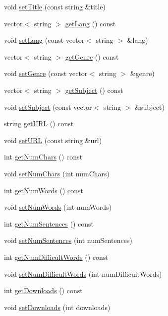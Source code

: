 \begin{DoxyCompactItemize}
void \mbox{\hyperlink{classbridges_1_1_book_a68e4e04db8915b6baff809c46e6d1df9}{set\+Title}} (const string \&title)
\item 
vector$<$ string $>$ \mbox{\hyperlink{classbridges_1_1_book_a946923e7d93c552f699ef44a5bbed643}{get\+Lang}} () const
\item 
void \mbox{\hyperlink{classbridges_1_1_book_a7c96cf79f310f78eb16035c6874afa05}{set\+Lang}} (const vector$<$ string $>$ \&lang)
\item 
vector$<$ string $>$ \mbox{\hyperlink{classbridges_1_1_book_a5c7c8787f7dca4634980d657807a0b22}{get\+Genre}} () const
\item 
void \mbox{\hyperlink{classbridges_1_1_book_a3743b908548b944543af533b030a1eca}{set\+Genre}} (const vector$<$ string $>$ \&genre)
\item 
vector$<$ string $>$ \mbox{\hyperlink{classbridges_1_1_book_a95158e5538b78c2115a2102b33d56980}{get\+Subject}} () const
\item 
void \mbox{\hyperlink{classbridges_1_1_book_aff19a506929a6df5503e2cd3e293381e}{set\+Subject}} (const vector$<$ string $>$ \&subject)
\item 
string \mbox{\hyperlink{classbridges_1_1_book_a3facf86f7560e974ec7cd81e0fc58800}{get\+U\+RL}} () const
\item 
void \mbox{\hyperlink{classbridges_1_1_book_a48d590f296837b8eb9ac10451c83d23b}{set\+U\+RL}} (const string \&url)
\item 
int \mbox{\hyperlink{classbridges_1_1_book_a96343d553aeadefe8aa88da3e1e9e635}{get\+Num\+Chars}} () const
\item 
void \mbox{\hyperlink{classbridges_1_1_book_a31f85f174ab86e6f9eb2131c3dbe1cdf}{set\+Num\+Chars}} (int num\+Chars)
\item 
int \mbox{\hyperlink{classbridges_1_1_book_a8da8afb48552bcc8095829c2741aa22f}{get\+Num\+Words}} () const
\item 
void \mbox{\hyperlink{classbridges_1_1_book_acbed3f0ff253868d8747826a27ef30ac}{set\+Num\+Words}} (int num\+Words)
\item 
int \mbox{\hyperlink{classbridges_1_1_book_ab426149d54f152a6a8e67d75d9b37f25}{get\+Num\+Sentences}} () const
\item 
void \mbox{\hyperlink{classbridges_1_1_book_af16061c14c40b1672c7801a4c3a2d33b}{set\+Num\+Sentences}} (int num\+Sentences)
\item 
int \mbox{\hyperlink{classbridges_1_1_book_a6a2622b9eee31c4abd222282f72e641c}{get\+Num\+Difficult\+Words}} () const
\item 
void \mbox{\hyperlink{classbridges_1_1_book_adc7a54f2a494aeac02cadb3eb4caedbc}{set\+Num\+Difficult\+Words}} (int num\+Difficult\+Words)
\item 
int \mbox{\hyperlink{classbridges_1_1_book_a5cf7753a23c68de8703df2fab5b5193a}{get\+Downloads}} () const
\item 
void \mbox{\hyperlink{classbridges_1_1_book_aa3e894e59ae043e7271861772b03632c}{set\+Downloads}} (int downloads)
\end{DoxyCompactItemize}


